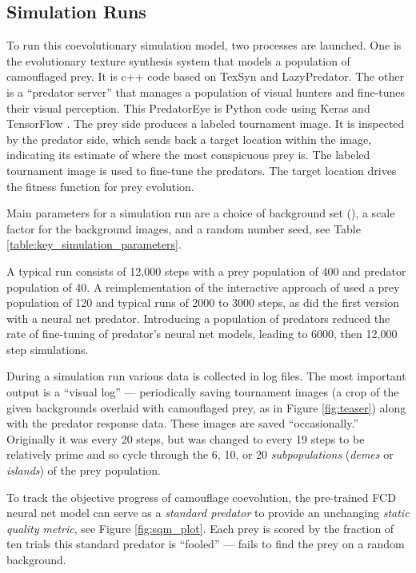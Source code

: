 \documentclass[letterpaper]{article}
\newcommand{\jargon}[1]{\textit{#1}}
\newcommand{\texsyn}[0]{TexSyn}
\newcommand{\lazypredator}[0]{LazyPredator}
\newcommand{\predatoreye}[0]{PredatorEye}
\begin{document}
\subsection{Simulation Runs}
\label{subsec:simulation_runs}
To run this coevolutionary simulation model, two processes are launched. One is the evolutionary texture synthesis system that models a population of camouflaged prey. It is c++ code based on \texsyn{} and \lazypredator{}. The other is a “predator server” that manages a population of visual hunters and fine-tunes their visual perception. This \predatoreye{} \cite{reynolds_predatoreye_2021} is Python code using Keras \cite{chollet_keras_2015} and TensorFlow \cite{tensorflow_whitepaper_2015}. The prey side produces a labeled tournament image. It is inspected by the predator side, which sends back a target location within the image, indicating its estimate of where the most conspicuous prey is. The labeled tournament image is used to fine-tune the predators. The target location drives the fitness function for prey evolution.
\par
Main parameters for a simulation run are a choice of background set (), a scale factor for the background images, and a random number seed, see Table \ref{table:key_simulation_parameters}.
\par
A typical run consists of 12,000 steps with a prey population of 400 and predator population of 40. A reimplementation of the interactive approach of \citet{reynolds_iec_2011} used a prey population of 120 and typical runs of 2000 to 3000 steps, as did the first version with a neural net predator. Introducing a population of predators reduced the rate of fine-tuning of predator's neural net models, leading to 6000, then 12,000 step simulations.
\par
During a simulation run various data is collected in log files. The most important output is a “visual log” — periodically saving tournament images (a crop of the given backgrounds overlaid with camouflaged prey, as in Figure \ref{fig:teaser}) along with the predator response data. These images are saved “occasionally.” Originally it was every 20 steps, but was changed to every 19 steps to be relatively prime and so cycle through the 6, 10, or 20 \jargon{subpopulations} (\jargon{demes} or \jargon{islands}) of the prey population.
\par
To track the objective progress of camouflage coevolution, the pre-trained FCD neural net model can serve as a \jargon{standard predator} to provide an unchanging \jargon{static quality metric}, see Figure \ref{fig:sqm_plot}. Each prey is scored by the fraction of ten trials this standard predator is “fooled” — fails to find the prey on a random background.
\par
\end{document}
